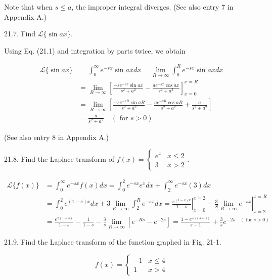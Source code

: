 \documentclass[10pt]{article}
\begin{document}
Note that when $s \leq a$, the improper integral diverges. (See also entry 7 in Appendix A.)

21.7. Find $\mathscr{L}\{\sin a x\}$.

Using Eq. (21.1) and integration by parts twice, we obtain

$$
\begin{aligned}
\mathscr{L}\{\sin a x\} & =\int_{0}^{\infty} e^{-s x} \sin a x d x=\lim _{R \rightarrow \infty} \int_{0}^{R} e^{-s x} \sin a x d x \\
& =\lim _{R \rightarrow \infty}\left[\frac{-s e^{-s x} \sin a x}{s^{2}+a^{2}}-\frac{a e^{-s x} \cos a x}{s^{2}+a^{2}}\right]_{x=0}^{x=R} \\
& =\lim _{R \rightarrow \infty}\left[\frac{-s e^{-s R} \sin a R}{s^{2}+a^{2}}-\frac{a e^{-s R} \cos a R}{s^{2}+a^{2}}+\frac{a}{s^{2}+a^{2}}\right] \\
& =\frac{a}{s^{2}+a^{2}} \quad(\text { for } s>0)
\end{aligned}
$$

(See also entry 8 in Appendix A.)

21.8. Find the Laplace transform of $f(x)=\left\{\begin{array}{rr}e^{x} & x \leq 2 \\ 3 & x>2\end{array}\right.$.

$$
\begin{aligned}
\mathscr{L}\{f(x)\} & =\int_{0}^{\infty} e^{-s x} f(x) d x=\int_{0}^{2} e^{-s x} e^{x} d x+\int_{2}^{\infty} e^{-s x}(3) d x \\
& =\int_{0}^{2} e^{(1-s) x} d x+3 \lim _{R \rightarrow \infty} \int_{2}^{R} e^{-s x} d x=\left.\frac{e^{(1-s) x}}{1-s}\right|_{x=0} ^{x=2}-\left.\frac{3}{S} \lim _{R \rightarrow \infty} e^{-s x}\right|_{x=2} ^{x=R} \\
& =\frac{e^{2(1-s)}}{1-s}-\frac{1}{1-s}-\frac{3}{s} \lim _{R \rightarrow \infty}\left[e^{-R s}-e^{-2 s}\right]=\frac{1-e^{-2(s-1)}}{s-1}+\frac{3}{s} e^{-2 s \quad(\text { for } s>0)}
\end{aligned}
$$

21.9. Find the Laplace transform of the function graphed in Fig. 21-1.

$$
f(x)=\left\{\begin{array}{rr}
-1 & x \leq 4 \\
1 & x>4
\end{array}\right.
$$
\end{document}
